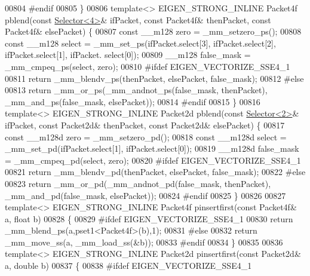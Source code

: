 \begin{DoxyCode}
{{00804 \textcolor{preprocessor}{#endif}
00805 \}
00806 \textcolor{keyword}{template}<> EIGEN\_STRONG\_INLINE Packet4f pblend(\textcolor{keyword}{const} \hyperlink{struct_eigen_1_1internal_1_1_selector}{Selector<4>}& ifPacket, \textcolor{keyword}{const} Packet4f& 
      thenPacket, \textcolor{keyword}{const} Packet4f& elsePacket) \{
00807   \textcolor{keyword}{const} \_\_m128 zero = \_mm\_setzero\_ps();
00808   \textcolor{keyword}{const} \_\_m128 select = \_mm\_set\_ps(ifPacket.select[3], ifPacket.select[2], ifPacket.select[1], ifPacket.
      select[0]);
00809   \_\_m128 false\_mask = \_mm\_cmpeq\_ps(select, zero);
00810 \textcolor{preprocessor}{#ifdef EIGEN\_VECTORIZE\_SSE4\_1}
00811   \textcolor{keywordflow}{return} \_mm\_blendv\_ps(thenPacket, elsePacket, false\_mask);
00812 \textcolor{preprocessor}{#else}
00813   \textcolor{keywordflow}{return} \_mm\_or\_ps(\_mm\_andnot\_ps(false\_mask, thenPacket), \_mm\_and\_ps(false\_mask, elsePacket));
00814 \textcolor{preprocessor}{#endif}
00815 \}
00816 \textcolor{keyword}{template}<> EIGEN\_STRONG\_INLINE Packet2d pblend(\textcolor{keyword}{const} \hyperlink{struct_eigen_1_1internal_1_1_selector}{Selector<2>}& ifPacket, \textcolor{keyword}{const} Packet2d& 
      thenPacket, \textcolor{keyword}{const} Packet2d& elsePacket) \{
00817   \textcolor{keyword}{const} \_\_m128d zero = \_mm\_setzero\_pd();
00818   \textcolor{keyword}{const} \_\_m128d select = \_mm\_set\_pd(ifPacket.select[1], ifPacket.select[0]);
00819   \_\_m128d false\_mask = \_mm\_cmpeq\_pd(select, zero);
00820 \textcolor{preprocessor}{#ifdef EIGEN\_VECTORIZE\_SSE4\_1}
00821   \textcolor{keywordflow}{return} \_mm\_blendv\_pd(thenPacket, elsePacket, false\_mask);
00822 \textcolor{preprocessor}{#else}
00823   \textcolor{keywordflow}{return} \_mm\_or\_pd(\_mm\_andnot\_pd(false\_mask, thenPacket), \_mm\_and\_pd(false\_mask, elsePacket));
00824 \textcolor{preprocessor}{#endif}
00825 \}
00826 
00827 \textcolor{keyword}{template}<> EIGEN\_STRONG\_INLINE Packet4f pinsertfirst(\textcolor{keyword}{const} Packet4f& a, \textcolor{keywordtype}{float} b)
00828 \{
00829 \textcolor{preprocessor}{#ifdef EIGEN\_VECTORIZE\_SSE4\_1}
00830   \textcolor{keywordflow}{return} \_mm\_blend\_ps(a,pset1<Packet4f>(b),1);
00831 \textcolor{preprocessor}{#else}
00832   \textcolor{keywordflow}{return} \_mm\_move\_ss(a, \_mm\_load\_ss(&b));
00833 \textcolor{preprocessor}{#endif}
00834 \}
00835 
00836 \textcolor{keyword}{template}<> EIGEN\_STRONG\_INLINE Packet2d pinsertfirst(\textcolor{keyword}{const} Packet2d& a, \textcolor{keywordtype}{double} b)
00837 \{
00838 \textcolor{preprocessor}{#ifdef EIGEN\_VECTORIZE\_SSE4\_1}
}}
\end{DoxyCode}
